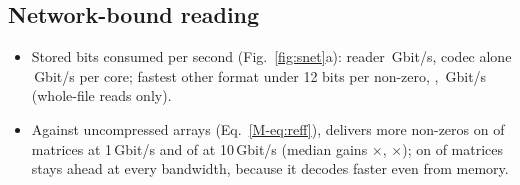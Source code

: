 \subsection{Network-bound reading}
\begin{itemize}\itemsep 1pt
\item Stored bits consumed per second (Fig.~\ref{fig:snet}a): \sone{} reader \,Gbit/s, codec alone
  \,Gbit/s per core; fastest other format under 12 bits per non-zero,
  , \,Gbit/s (whole-file reads only).
\item Against uncompressed arrays (Eq.~\ref{M-eq:reff}), \sone{} delivers more non-zeros on  of
   matrices at 1\,Gbit/s and  of  at 10\,Gbit/s (median gains
  $\times$, $\times$); on  of 
  matrices \sone{} stays ahead at every bandwidth, because it decodes faster even from memory.
\end{itemize}

